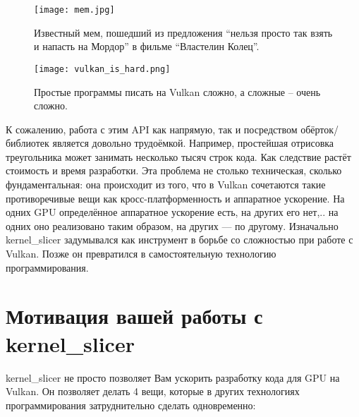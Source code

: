\documentclass[11pt,fleqn,english,russian]{report} %
\begin{document}
\begin{figure}[h]
\begin{minipage}{0.45\textwidth}
	\centering
	\texttt{[image: mem.jpg]}
	\caption{Известный мем, пошедший из предложения ``нельзя просто так взять и напасть на Мордор'' в фильме ``Властелин Колец''.}
	\label{fig:mem}
\end{minipage}
\hfill
\begin{minipage}{0.45\textwidth}
	\centering
	\texttt{[image: vulkan\_is\_hard.png]}
	\caption{Простые программы писать на Vulkan сложно, а сложные -- очень сложно.}
	\label{fig:vulkan_complexity}
\end{minipage}
\end{figure}


К сожалению, работа с этим API как напрямую, так и посредством обёрток/библиотек является довольно трудоёмкой. Например, простейшая отрисовка треугольника может занимать несколько тысяч строк кода. Как следствие растёт стоимость и время разработки. Эта проблема не столько техническая, сколько фундаментальная: она происходит из того, что в Vulkan сочетаются такие противоречивые вещи как кросс-платформенность и аппаратное ускорение. На одних GPU определённое аппаратное ускорение есть, на других его нет,.. на одних оно реализовано таким образом, на других --- по другому. Изначально kernel\_slicer задумывался как инструмент в борьбе со сложностью при работе с Vulkan. Позже он превратился в самостоятельную технологию программирования.


\section{Мотивация вашей работы с kernel\_slicer }

kernel\_slicer не просто позволяет Вам ускорить разработку кода для GPU на Vulkan. Он позволяет делать 4 вещи, которые в других технологиях программирования затруднительно сделать одновременно:
\end{document}
